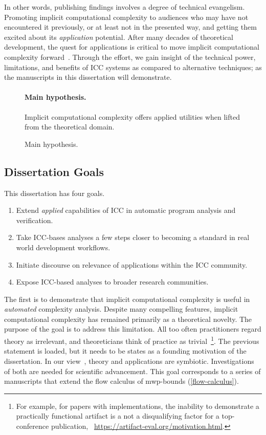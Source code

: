 In other words, publishing findings involves a degree of technical evangelism.
Promoting implicit computational complexity to audiences who may have not encountered it previously, or at least not in the presented way, and getting them excited about its \emph{application} potential.
After many decades of theoretical development, the quest for applications is critical to move implicit computational complexity forward~\cite[p.~7]{moyen2017}.
Through the effort, we gain insight of the technical power, limitations, and benefits of ICC systems as compared to alternative techniques;
as the manuscripts in this dissertation will demonstrate.

\begin{figure}[t]
\begin{mdframed}
\paragraph*{Main hypothesis.}
Implicit computational complexity offers applied utilities when lifted from the theoretical domain.
\end{mdframed}
\caption[Main hypothesis summarized]{Main hypothesis.}
\label{fig:hypothesis}
\end{figure}

\subsection{Dissertation Goals}\label{subsec:specific-aims}

This dissertation has four goals.

\begin{enumerate}
\item Extend \emph{applied} capabilities of ICC in automatic program analysis and verification.
\item Take ICC-bases analyses a few steps closer to becoming a standard in real world development workflows.
\item Initiate discourse on relevance of applications within the ICC community.
\item Expose ICC-based analyses to broader research communities.
\end{enumerate}

The first is to demonstrate that implicit computational complexity is useful in \emph{automated} complexity analysis.
Despite many compelling features, implicit computational complexity has remained primarily as a theoretical novelty.
The purpose of the goal is to address this limitation.
All too often practitioners regard theory as irrelevant, and theoreticians think of practice as trivial~\cite[pg. xxxv]{bishop2003}\footnote{
For example, for papers with implementations, the inability to demonstrate a practically functional artifact is a not a disqualifying factor for a top-conference publication,
\cf\eg~\url{https://artifact-eval.org/motivation.html}.}.
The previous statement is loaded, but it needs to be states as a founding motivation of the dissertation.
In our view~\cite[p. 75]{moyen2017}, theory and applications are symbiotic.
Investigations of both are needed for scientific advancement.
This goal corresponds to a series of manuscripts that extend the flow calculus of mwp-bounds (\autoref{flow-calculus}).


